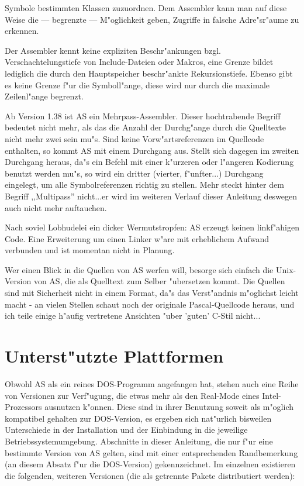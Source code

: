 \documentclass[12pt,a4paper,twoside]{report}
\begin{document}
Symbole bestimmten Klassen zuzuordnen.  Dem Assembler kann man auf diese
Weise die --- begrenzte --- M"oglichkeit geben, Zugriffe in falsche
Adre"sr"aume zu erkennen.
\par
Der Assembler kennt keine expliziten Beschr"ankungen bzgl.
Verschachtelungstiefe von Include-Dateien oder Makros, eine Grenze bildet
lediglich die durch den Hauptspeicher beschr"ankte Rekursionstiefe.
Ebenso gibt es keine Grenze f"ur die Symboll"ange, diese wird nur durch
die maximale Zeilenl"ange begrenzt.
\par
Ab Version 1.38 ist AS ein Mehrpass-Assembler.  Dieser hochtrabende Begriff
bedeutet nicht mehr, als das die Anzahl der Durchg"ange durch die Quelltexte
nicht mehr zwei sein mu"s.  Sind keine Vorw"artsreferenzen im Quellcode
enthalten, so kommt AS mit einem Durchgang aus.  Stellt sich dagegen im zweiten
Durchgang heraus, da"s ein Befehl mit einer k"urzeren oder l"angeren Kodierung
benutzt werden mu"s, so wird ein dritter (vierter, f"unfter...) Durchgang
eingelegt, um alle Symbolreferenzen richtig zu stellen.  Mehr steckt hinter dem
Begriff ,,Multipass'' nicht...er wird im weiteren Verlauf dieser Anleitung
deswegen auch nicht mehr auftauchen.
\par
Nach soviel Lobhudelei ein dicker Wermutstropfen: AS erzeugt keinen
linkf"ahigen Code.  Eine Erweiterung um einen Linker w"are mit erheblichem
Aufwand verbunden und ist momentan nicht in Planung.
\par
Wer einen Blick in die Quellen von AS werfen will, besorge sich einfach
die Unix-Version von AS, die als Quelltext zum Selber "ubersetzen kommt.
Die Quellen sind mit Sicherheit nicht in einem Format, da"s das
Verst"andnis m"oglichst leicht macht - an vielen Stellen schaut noch
der originale Pascal-Quellcode heraus, und ich teile einige h"aufig
vertretene Ansichten "uber 'guten' C-Stil nicht...


\section{Unterst"utzte Plattformen}

Obwohl AS als ein reines DOS-Programm  angefangen
hat, stehen auch eine Reihe von Versionen zur Verf"ugung, die etwas mehr
als den Real-Mode eines Intel-Prozessors ausnutzen k"onnen.  Diese sind in
ihrer Benutzung soweit als m"oglich kompatibel gehalten zur DOS-Version,
es ergeben sich nat"urlich bisweilen Unterschiede in der Installation und
der Einbindung in die jeweilige Betriebssystemumgebung.  Abschnitte in
dieser Anleitung, die nur f"ur eine bestimmte Version von AS gelten, sind
mit einer entsprechenden Randbemerkung (an diesem Absatz f"ur die
DOS-Version) gekennzeichnet.  Im einzelnen existieren die folgenden,
weiteren Versionen (die als getrennte Pakete distributiert werden):
\end{document}
